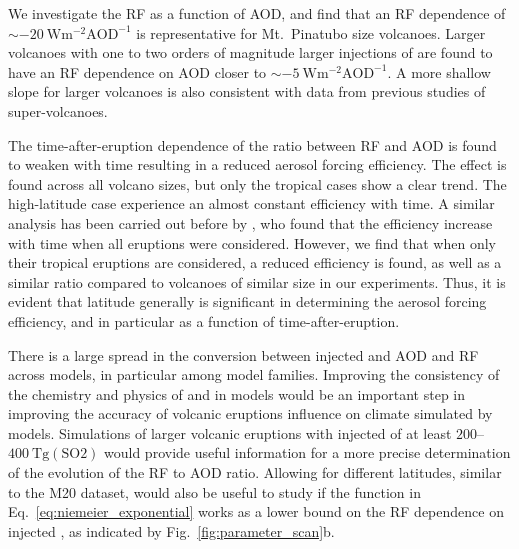 \documentclass[draft]{agujournal2019}
\newcommand{\iso}[1][i]{{#1}njected \ce{SO2}}
\begin{document}
We investigate the RF as a function of AOD, and find that an RF dependence of
\(\sim\SI{-20}{\watt\metre^{-2}\mathrm{AOD}^{-1}}\) is representative for Mt.\ Pinatubo
size volcanoes. Larger volcanoes with one to two orders of magnitude larger injections
of  are found to have an RF dependence on AOD closer to \(\sim
\SI{-5}{\watt\metre^{-2}\mathrm{AOD}^{-1}}\). A more shallow slope for larger volcanoes
is also consistent with data from previous studies of super-volcanoes.

The time-after-eruption dependence of the ratio between RF and AOD is found to weaken
with time resulting in a reduced aerosol forcing efficiency. The effect is found across
all volcano sizes, but only the tropical cases show a clear trend. The high-latitude
case experience an almost constant efficiency with time. A similar analysis has been
carried out before by , who found that the efficiency increase with
time when all eruptions were considered. However, we find that when only their tropical
eruptions are considered, a reduced efficiency is found, as well as a similar ratio
compared to volcanoes of similar size in our experiments. Thus, it is evident that
latitude generally is significant in determining the aerosol forcing efficiency, and in
particular as a function of time-after-eruption.

There is a large spread in the conversion between \iso{} and AOD and RF across models,
in particular among model families. Improving the consistency of the chemistry and
physics of  and  in models would be an important step in improving the
accuracy of volcanic eruptions influence on climate simulated by models. Simulations of
larger volcanic eruptions with \iso{} of at least
\(200\)--\(\SI{400}{\tera\gram(\mathrm{SO2})}\) would provide useful information for a
more precise determination of the evolution of the RF to AOD ratio. Allowing for
different latitudes, similar to the M20 dataset, would also be useful to study if the
function in Eq.~\ref{eq:niemeier_exponential} works as a lower bound on the RF
dependence on \iso{}, as indicated by Fig.~\ref{fig:parameter_scan}b.


%
%
%
%
\appendix
\end{document}
